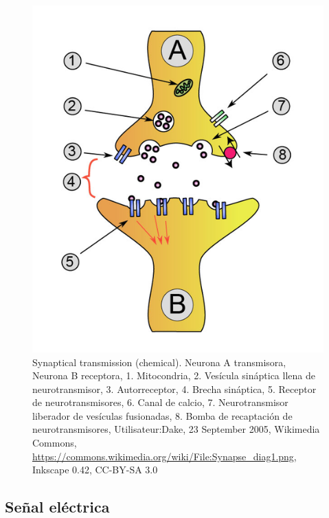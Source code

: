 \begin{description}
\begin{figure}[h]
 \centering
 \includegraphics[scale=0.2]{../Figuras/SinapsisQuimica1.png}
 \caption{Synaptical transmission (chemical). Neurona A transmisora, Neurona B receptora, 1. Mitocondria, 2. Vesícula sináptica llena de neurotransmisor, 3. Autorreceptor, 4. Brecha sináptica, 5. Receptor de neurotransmisores, 6. Canal de calcio, 7. Neurotransmisor liberador de vesículas fusionadas, 8. Bomba de recaptación de neurotransmisores, Utilisateur:Dake, 23 September 2005, Wikimedia Commons, \url{https://commons.wikimedia.org/wiki/File:Synapse_diag1.png}, Inkscape 0.42, CC-BY-SA 3.0}
 \label{fig:sinapsisQ}
\end{figure}

\end{description}








\subsection{Señal eléctrica}

